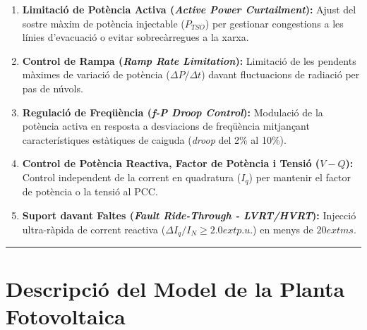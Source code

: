 \documentclass[
  catalan,
  letterpaper,
  DIV=11,
  numbers=noendperiod]{scrartcl}
\providecommand{\tightlist}{%
  \setlength{\itemsep}{0pt}\setlength{\parskip}{0pt}}
\begin{document}
\begin{tcolorbox}[enhanced jigsaw, arc=.35mm, bottomrule=.15mm, bottomtitle=1mm, breakable, colback=white, colbacktitle=quarto-callout-important-color!10!white, colframe=quarto-callout-important-color-frame, coltitle=black, left=2mm, leftrule=.75mm, opacityback=0, opacitybacktitle=0.6, rightrule=.15mm, title=\textcolor{quarto-callout-important-color}{\faExclamation}\hspace{0.5em}{Funcions Regulades del PPC}, titlerule=0mm, toprule=.15mm, toptitle=1mm]

\begin{enumerate}
\def\labelenumi{\arabic{enumi}.}
\tightlist
\item
  \textbf{Limitació de Potència Activa (\emph{Active Power
  Curtailment}):} Ajust del sostre màxim de potència injectable
  (\(P_{TSO}\)) per gestionar congestions a les línies d'evacuació o
  evitar sobrecàrregues a la xarxa.
\item
  \textbf{Control de Rampa (\emph{Ramp Rate Limitation}):} Limitació de
  les pendents màximes de variació de potència (\(\Delta P / \Delta t\))
  davant fluctuacions de radiació per pas de núvols.
\item
  \textbf{Regulació de Freqüència (\emph{f-P Droop Control}):} Modulació
  de la potència activa en resposta a desviacions de freqüència
  mitjançant característiques estàtiques de caiguda (\emph{droop} del
  2\% al 10\%).
\item
  \textbf{Control de Potència Reactiva, Factor de Potència i Tensió
  (\(V-Q\)):} Control independent de la corrent en quadratura (\(I_q\))
  per mantenir el factor de potència o la tensió al PCC.
\item
  \textbf{Suport davant Faltes (\emph{Fault Ride-Through - LVRT/HVRT}):}
  Injecció ultra-ràpida de corrent reactiva
  (\(\Delta I_q / I_N \ge 2.0    ext{ p.u.}\)) en menys de
  \(20    ext{ ms}\).
\end{enumerate}

\end{tcolorbox}

\begin{center}\rule{0.5\linewidth}{0.5pt}\end{center}

\section{Descripció del Model de la Planta
Fotovoltaica}\label{descripciuxf3-del-model-de-la-planta-fotovoltaica}
\end{document}
